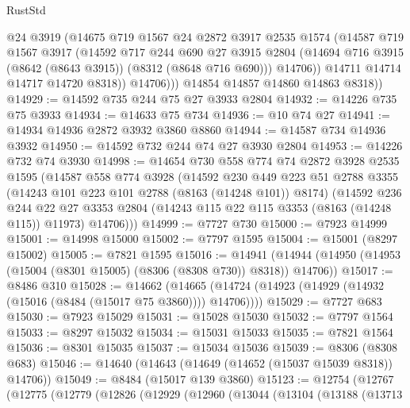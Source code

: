 \begin{lexlean}{RustStd}
\begin{coremodule}
                @24
                @3919
                (@14675
                  @719
                  @1567
                  @24
                  @2872
                  @3917
                  @2535
                  @1574
                  (@14587
                    @719
                    @1567
                    @3917
                    (@14592
                      @717
                      @244
                      @690
                      @27
                      @3915
                      @2804
                      (@14694 @716 @3915 (@8642 (@8643 @3915)) (@8312 (@8648 @716 @690)))
                      @14706))
                  @14711
                  @14714
                  @14717
                  @14720
                  @8318))
              @14706)))
        @14854
        @14857
        @14860
        @14863
        @8318))
@14929 := @14592 @735 @244 @75 @27 @3933 @2804
@14932 := @14226 @735 @75 @3933
@14934 := @14633 @75 @734
@14936 := @10 @74 @27
@14941 := @14934 @14936 @2872 @3932 @3860 @8860
@14944 := @14587 @734 @14936 @3932
@14950 := @14592 @732 @244 @74 @27 @3930 @2804
@14953 := @14226 @732 @74 @3930
@14998 := @14654
    @730
    @558
    @774
    @74
    @2872
    @3928
    @2535
    @1595
    (@14587
      @558
      @774
      @3928
      (@14592
        @230
        @449
        @223
        @51
        @2788
        @3355
        (@14243 @101 @223 @101 @2788 (@8163 (@14248 @101)) @8174)
        (@14592
          @236
          @244
          @22
          @27
          @3353
          @2804
          (@14243 @115 @22 @115 @3353 (@8163 (@14248 @115)) @11973)
          @14706)))
@14999 := @7727 @730
@15000 := @7923 @14999
@15001 := @14998 @15000
@15002 := @7797 @1595
@15004 := @15001 (@8297 @15002)
@15005 := @7821 @1595
@15016 := @14941
    (@14944 (@14950 (@14953 (@15004 (@8301 @15005) (@8306 (@8308 @730)) @8318)) @14706))
@15017 := @8486 @310
@15028 := @14662
    (@14665 (@14724 (@14923 (@14929 (@14932 (@15016 (@8484 (@15017 @75 @3860)))) @14706))))
@15029 := @7727 @683
@15030 := @7923 @15029
@15031 := @15028 @15030
@15032 := @7797 @1564
@15033 := @8297 @15032
@15034 := @15031 @15033
@15035 := @7821 @1564
@15036 := @8301 @15035
@15037 := @15034 @15036
@15039 := @8306 (@8308 @683)
@15046 := @14640 (@14643 (@14649 (@14652 (@15037 @15039 @8318)) @14706))
@15049 := @8484 (@15017 @139 @3860)
@15123 := @12754
    (@12767
      (@12775
        (@12779
          (@12826
            (@12929
              (@12960
                (@13044
                  (@13104
                    (@13188
                      (@13713

\end{coremodule}
\end{lexlean}
